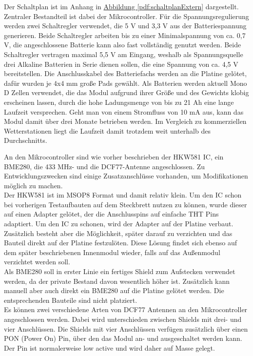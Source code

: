 \documentclass[a4paper,11pt]{article}
\begin{document}
Der Schaltplan ist im Anhang in \hyperref[pdf:schaltplanExtern]{Abbildung \ref{pdf:schaltplanExtern}} dargestellt. Zentraler Bestandteil ist dabei der Mikrocontroller. 
Für die Spannungsregulierung werden zwei Schaltregler verwendet, die 5 V und 3,3 V aus der Batteriespannung generieren. Beide Schaltregler arbeiten bis zu einer Minimalspannung
von ca. 0,7 V, die angeschlossene Batterie kann also fast vollständig genutzt werden. Beide Schaltregler vertragen maximal 5,5 V am Eingang, weshalb als Spannungsquelle
drei Alkaline Batterien in Serie dienen sollen, die eine Spannung von ca. 4,5 V bereitstellen. 
Die Anschlusskabel des Batteriefachs werden an die Platine gelötet, dafür wurden je 4x4 mm große Pads gewählt. 
Als Batterien werden aktuell Mono D Zellen verwendet, die das Modul aufgrund ihrer Größe und des Gewichts klobig erscheinen lassen, durch die hohe Ladungsmenge von bis zu
21 Ah eine lange Laufzeit versprechen. Geht man von einem Stromfluss von 10 mA aus, kann das Modul damit über drei Monate betrieben werden. Im Vergleich zu kommerziellen
Wetterstationen liegt die Laufzeit damit trotzdem weit unterhalb des Durchschnitts.  

\vspace{0.2cm}
\noindent
An den Mikrocontroller sind wie vorher beschrieben der HKW581 IC, ein BME280, die 433 MHz- und die DCF77-Antenne angeschlossen. Zu Entwicklungszwecken sind einige 
Zusatzanschlüsse vorhanden, um Modifikationen möglich zu machen. \\
Der HKW581 ist im MSOP8 Format und damit relativ klein. Um den IC schon bei vorherigen Testaufbauten auf dem Steckbrett nutzen zu können, wurde dieser auf einen Adapter
gelötet, der die Anschlusspins auf einfache THT Pins adaptiert. Um den IC zu schonen, wird der Adapter auf der Platine verbaut. Zusätzlich besteht aber die Möglichkeit, 
später darauf zu verzichten und das Bauteil direkt auf der Platine festzulöten. Diese Lösung findet sich ebenso auf dem später beschriebenen Innenmodul wieder, falls
auf das Außenmodul verzichtet werden soll. \\
Als BME280 soll in erster Linie ein fertiges Shield zum Aufstecken verwendet werden, da der private Bestand davon wesentlich höher ist. Zusätzlich kann manuell aber auch
direkt ein BME280 auf die Platine gelötet werden. Die entsprechenden Bauteile sind nicht platziert. \\
Es können zwei verschiedene Arten von DCF77 Antennen an den Mikrocontroller angeschlossen werden. Dabei wird unterschieden zwischen Shields mit drei- und vier Anschlüssen. 
Die Shields mit vier Anschlüssen verfügen zusätzlich über einen PON (Power On) Pin, über den das Modul an- und ausgeschaltet werden kann. Der Pin ist normalerweise low
active und wird daher auf Masse gelegt. 
\end{document}
